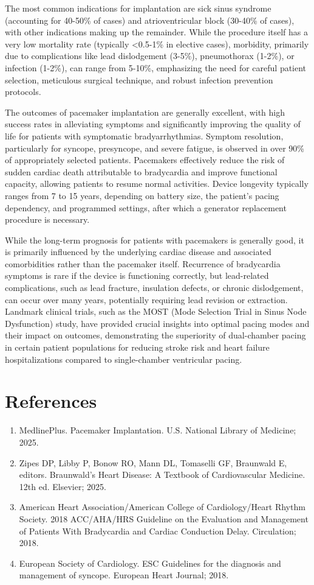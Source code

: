 The most common indications for implantation are sick sinus syndrome (accounting for 40-50\% of cases) and atrioventricular block (30-40\% of cases), with other indications making up the remainder. While the procedure itself has a very low mortality rate (typically <0.5-1\% in elective cases), morbidity, primarily due to complications like lead dislodgement (3-5\%), pneumothorax (1-2\%), or infection (1-2\%), can range from 5-10\%, emphasizing the need for careful patient selection, meticulous surgical technique, and robust infection prevention protocols.

The outcomes of pacemaker implantation are generally excellent, with high success rates in alleviating symptoms and significantly improving the quality of life for patients with symptomatic bradyarrhythmias. Symptom resolution, particularly for syncope, presyncope, and severe fatigue, is observed in over 90\% of appropriately selected patients. Pacemakers effectively reduce the risk of sudden cardiac death attributable to bradycardia and improve functional capacity, allowing patients to resume normal activities. Device longevity typically ranges from 7 to 15 years, depending on battery size, the patient's pacing dependency, and programmed settings, after which a generator replacement procedure is necessary.

While the long-term prognosis for patients with pacemakers is generally good, it is primarily influenced by the underlying cardiac disease and associated comorbidities rather than the pacemaker itself. Recurrence of bradycardia symptoms is rare if the device is functioning correctly, but lead-related complications, such as lead fracture, insulation defects, or chronic dislodgement, can occur over many years, potentially requiring lead revision or extraction. Landmark clinical trials, such as the MOST (Mode Selection Trial in Sinus Node Dysfunction) study, have provided crucial insights into optimal pacing modes and their impact on outcomes, demonstrating the superiority of dual-chamber pacing in certain patient populations for reducing stroke risk and heart failure hospitalizations compared to single-chamber ventricular pacing.

\section*{References}
\begin{enumerate}
  \item MedlinePlus. Pacemaker Implantation. U.S. National Library of Medicine; 2025.
  \item Zipes DP, Libby P, Bonow RO, Mann DL, Tomaselli GF, Braunwald E, editors. Braunwald's Heart Disease: A Textbook of Cardiovascular Medicine. 12th ed. Elsevier; 2025.
  \item American Heart Association/American College of Cardiology/Heart Rhythm Society. 2018 ACC/AHA/HRS Guideline on the Evaluation and Management of Patients With Bradycardia and Cardiac Conduction Delay. Circulation; 2018.
  \item European Society of Cardiology. ESC Guidelines for the diagnosis and management of syncope. European Heart Journal; 2018.
\end{enumerate}

\clearpage
